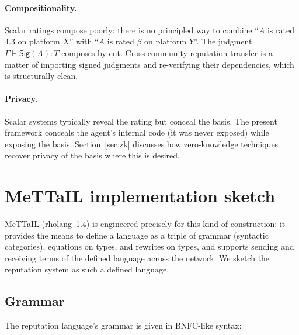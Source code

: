 \documentclass[11pt]{article}
\theoremstyle{definition}
\theoremstyle{plain}
\theoremstyle{remark}
\newcommand{\Sig}{\mathsf{Sig}}
\begin{document}
\paragraph{Compositionality.} Scalar ratings compose poorly: there is no principled way to combine ``$A$ is rated $4.3$ on platform $X$'' with ``$A$ is rated $\beta$ on platform $Y$''. The judgment $\Gamma \vdash \Sig(A) : T$ composes by cut. Cross-community reputation transfer is a matter of importing signed judgments and re-verifying their dependencies, which is structurally clean.

\paragraph{Privacy.} Scalar systems typically reveal the rating but conceal the basis. The present framework conceals the agent's internal code (it was never exposed) while exposing the basis. Section~\ref{sec:zk} discusses how zero-knowledge techniques recover privacy of the basis where this is desired.

\section{MeTTaIL implementation sketch}\label{sec:mettail}

MeTTaIL (rholang~1.4) is engineered precisely for this kind of construction: it provides the means to define a language as a triple of grammar (syntactic categories), equations on types, and rewrites on types, and supports sending and receiving terms of the defined language across the network. We sketch the reputation system as such a defined language.

\subsection{Grammar}

The reputation language's grammar is given in BNFC-like syntax:
\end{document}

